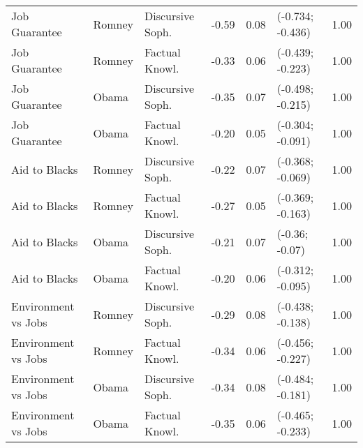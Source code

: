 \begin{table}[ht]
\begin{tabular}{lllrrlr}
  Job Guarantee & Romney & Discursive Soph. & -0.59 & 0.08 & (-0.734; -0.436) & 1.00 \\ 
  Job Guarantee & Romney & Factual Knowl. & -0.33 & 0.06 & (-0.439; -0.223) & 1.00 \\ 
  Job Guarantee & Obama & Discursive Soph. & -0.35 & 0.07 & (-0.498; -0.215) & 1.00 \\ 
  Job Guarantee & Obama & Factual Knowl. & -0.20 & 0.05 & (-0.304; -0.091) & 1.00 \\ 
  Aid to Blacks & Romney & Discursive Soph. & -0.22 & 0.07 & (-0.368; -0.069) & 1.00 \\ 
  Aid to Blacks & Romney & Factual Knowl. & -0.27 & 0.05 & (-0.369; -0.163) & 1.00 \\ 
  Aid to Blacks & Obama & Discursive Soph. & -0.21 & 0.07 & (-0.36; -0.07) & 1.00 \\ 
  Aid to Blacks & Obama & Factual Knowl. & -0.20 & 0.06 & (-0.312; -0.095) & 1.00 \\ 
  Environment vs Jobs & Romney & Discursive Soph. & -0.29 & 0.08 & (-0.438; -0.138) & 1.00 \\ 
  Environment vs Jobs & Romney & Factual Knowl. & -0.34 & 0.06 & (-0.456; -0.227) & 1.00 \\ 
  Environment vs Jobs & Obama & Discursive Soph. & -0.34 & 0.08 & (-0.484; -0.181) & 1.00 \\ 
  Environment vs Jobs & Obama & Factual Knowl. & -0.35 & 0.06 & (-0.465; -0.233) & 1.00 \\ 
   \hline
\end{tabular}
\end{table}
